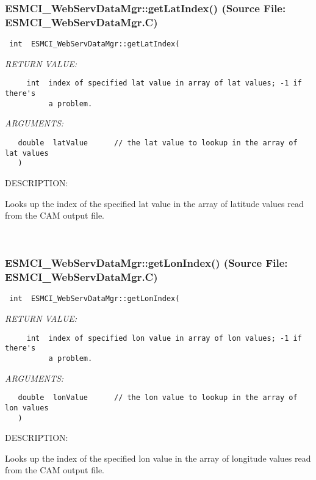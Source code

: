 \subsubsection{ESMCI\_WebServDataMgr::getLatIndex() (Source File: ESMCI\_WebServDataMgr.C)}


  
\begin{verbatim} int  ESMCI_WebServDataMgr::getLatIndex(\end{verbatim}{\em RETURN VALUE:}
\begin{verbatim}     int  index of specified lat value in array of lat values; -1 if there's
          a problem.\end{verbatim}{\em ARGUMENTS:}
\begin{verbatim}   double  latValue      // the lat value to lookup in the array of lat values
   )\end{verbatim}
{\sf DESCRIPTION:\\ }


      Looks up the index of the specified lat value in the array of latitude
      values read from the CAM output file.
   
 
\mbox{}\hrulefill\
 
\subsubsection{ESMCI\_WebServDataMgr::getLonIndex() (Source File: ESMCI\_WebServDataMgr.C)}


  
\begin{verbatim} int  ESMCI_WebServDataMgr::getLonIndex(\end{verbatim}{\em RETURN VALUE:}
\begin{verbatim}     int  index of specified lon value in array of lon values; -1 if there's
          a problem.\end{verbatim}{\em ARGUMENTS:}
\begin{verbatim}   double  lonValue      // the lon value to lookup in the array of lon values
   )\end{verbatim}
{\sf DESCRIPTION:\\ }


      Looks up the index of the specified lon value in the array of longitude
      values read from the CAM output file.
   
